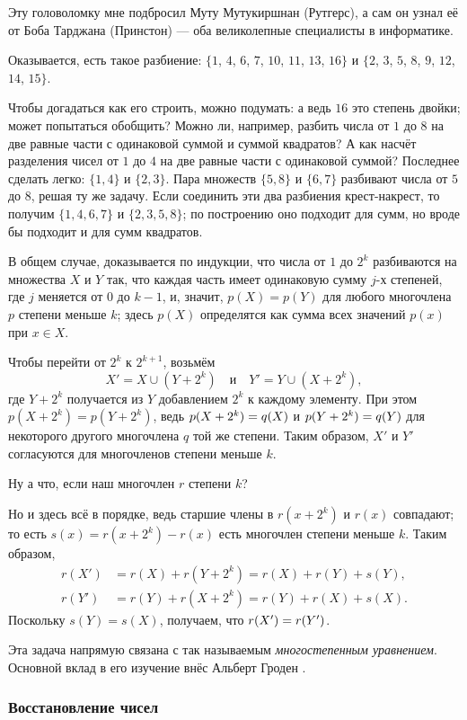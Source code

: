 Эту головоломку мне подбросил Муту Мутукиршнан (Рутгерс),
а сам он узнал её от Боба Тарджана (Принстон) — 
оба великолепные специалисты в информатике.

Оказывается, есть такое разбиение: $\{1$, $4$, $6$, $7$, $10$, $11$, $13$, $16\}$ и $\{2$, $3$, $5$, $8$, $9$, $12$, $14$, $15\}$.

Чтобы догадаться как его строить, можно подумать:
а ведь $16$ это степень двойки;
может попытаться обобщить?
Можно ли, например, разбить числа от $1$ до $8$ на две равные части с одинаковой суммой и суммой квадратов?
А как насчёт разделения чисел от $1$ до $4$ на две равные части с одинаковой суммой?
Последнее сделать легко: $\{1, 4\}$ и $\{2, 3\}$.
Пара множеств $\{5, 8\}$ и $\{6, 7\}$ разбивают числа от $5$ до $8$, решая ту же задачу.
Если соединить эти два разбиения крест-накрест, то получим $\{1, 4, 6, 7\}$ и $\{2, 3, 5, 8\}$; по построению оно подходит для сумм, но вроде бы подходит и для сумм квадратов.

В общем случае, доказывается по индукции, что числа от $1$ до $2^k$ разбиваются на множества $X$ и $Y$ так, что каждая часть имеет одинаковую сумму $j$-х степеней, где $j$ меняется от $0$ до $k - 1$, и, значит, $p(X)=p(Y)$ для любого многочлена $p$ степени меньше $k$;
здесь $p(X)$ определятся как сумма всех значений $p(x)$ при $x \in X$.

Чтобы перейти от $2^{k}$ к $2^{k+1}$, возьмём 
\[X' = X \cup (Y + 2^k)\quad\text{и}\quad Y' = Y \cup (X + 2^k),\]
где $Y + 2^k$ получается из $Y$ добавлением $2^k$ к каждому элементу.
При этом $p(X + 2^k) = p(Y + 2^k)$,
ведь $p(X + 2^k)\z=q(X)$ и $p(Y + 2^k)\z=q(Y)$ для некоторого другого многочлена $q$ той же степени.
Таким образом, $X'$ и $Y'$ согласуются для многочленов степени меньше $k$. 

Ну а что, если наш многочлен $r$ степени $k$?

Но и здесь всё в порядке, ведь старшие члены в $r(x+2^k)$ и $r(x)$ совпадают;
то есть $s(x)=r(x+2^k)-r(x)$ есть многочлен степени меньше $k$.
Таким образом,
\begin{align*}
r(X')&=r(X)+r(Y+2^k)=r(X)+r(Y)+s(Y),
\\
r(Y')&=r(Y)+r(X+2^k)=r(Y)+r(X)+s(X).
\end{align*}
Поскольку $s(Y)=s(X)$, получаем, что $r(X')\z=r(Y')$.

Эта задача напрямую связана с так называемым \emph{многостепенным уравнением}.
Основной вклад в его изучение внёс Альберт Гроден \cite{gloden}.

\subsubsection*{Восстановление чисел}

